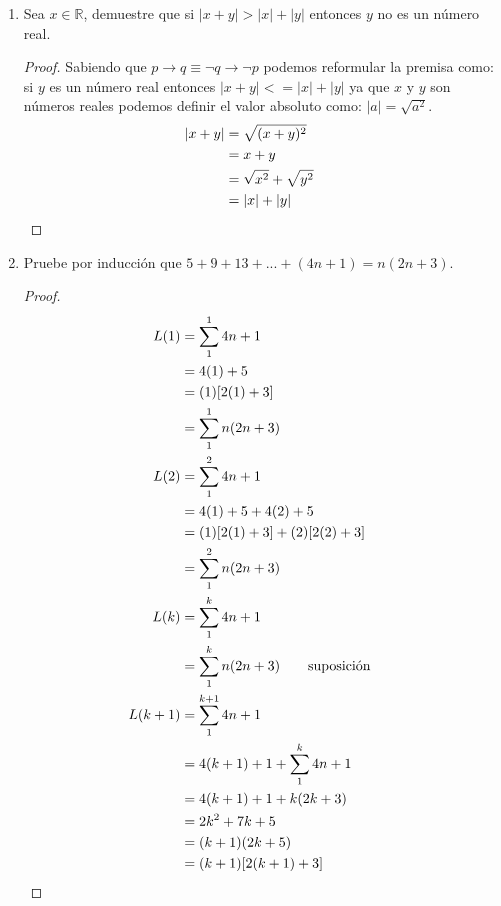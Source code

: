 \documentclass[a4paper,10pt]{article}
\begin{document}
\begin{enumerate}
  \item Sea $x \in \mathbb{R}$, demuestre que si $|x + y| > |x| + |y|$ entonces $y$ no es un número real.
  \begin{proof}
   Sabiendo que $p \to q \equiv \neg q \to \neg p$ podemos reformular la premisa como: si $y$ es un número real entonces $|x + y| <= |x| + |y|$ ya que $x$ y $y$ son números reales podemos definir el valor absoluto como: $|a| = \sqrt{a^2}$.
   \begin{align*}
   |x + y| &= \sqrt{(x + y)^2}
   \\ &= x + y
   \\ &= \sqrt{x^2} + \sqrt{y^2}
   \\ &= |x| + |y| &&\qedhere
   \end{align*}
  \end{proof}

  \item Pruebe por inducción que $ 5+9+13+...+(4n+1)=n(2n+3) $.
  \begin{proof}
   \begin{align*}
   L(1) &= \sum_{1}^{1} 4n+1 
   \\ &= 4(1) + 5
   \\ &= (1)[2(1) + 3]
   \\ &= \sum_{1}^{1} n(2n + 3)
   \\ L(2) &= \sum_{1}^{2} 4n + 1 
   \\ &= 4(1) + 5 + 4(2) + 5
   \\ &= (1)[2(1) + 3] + (2)[2(2) + 3]
   \\ &= \sum_{1}^{2} n(2n + 3)
   \\ L(k) &= \sum_{1}^{k} 4n + 1
   \\ &= \sum_{1}^{k} n(2n + 3)         \tag*{suposición}
   \\ L(k + 1) &= \sum_{1}^{k + 1} 4n + 1
   \\ &= 4(k + 1) + 1 + \sum_{1}^{k} 4n + 1
   \\ &= 4(k + 1) + 1 + k(2k + 3)
   \\ &= 2k^2 + 7k + 5
   \\ &= (k + 1)(2k + 5)
   \\ &= (k + 1)[2(k + 1) + 3] &&\qedhere
   \end{align*}
  \end{proof}


\end{enumerate}
\end{document}
